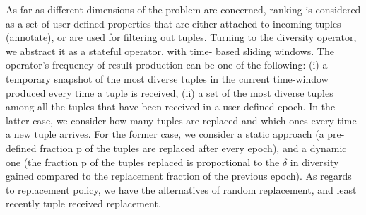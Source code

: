 As far as different dimensions of the problem are concerned, ranking is
considered as a set of user-defined properties that are either attached to
incoming tuples (annotate), or are used for filtering out tuples. Turning
to the diversity operator, we abstract it as a stateful operator, with time-
based sliding windows. The operator's frequency of result production
can be one of the following: (i) a temporary snapshot of the most diverse
tuples in the current time-window produced every time a tuple is received,
(ii) a set of the most diverse tuples among all the tuples that have been
received in a user-defined epoch. In the latter case, we consider how
many tuples are replaced and which ones every time a new tuple arrives.
For the former case, we consider a static approach (a pre-defined fraction
p of the tuples are replaced after every epoch), and a dynamic one (the
fraction p of the tuples replaced is proportional to the $\delta$ in diversity gained
compared to the replacement fraction of the previous epoch). As regards
to replacement policy, we have the alternatives of random replacement,
and least recently tuple received replacement.